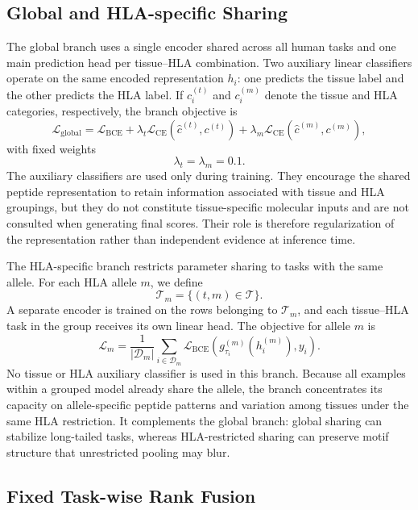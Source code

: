 \subsection{Global and HLA-specific Sharing}

The global branch uses a single encoder shared across all human tasks and one main prediction head per tissue--HLA combination. Two auxiliary linear classifiers operate on the same encoded representation \(h_i\): one predicts the tissue label and the other predicts the HLA label. If \(c_i^{(t)}\) and \(c_i^{(m)}\) denote the tissue and HLA categories, respectively, the branch objective is
\[
\mathcal{L}_{\mathrm{global}}
=
\mathcal{L}_{\mathrm{BCE}}
+
\lambda_t
\mathcal{L}_{\mathrm{CE}}
\left(
\widehat{c}^{(t)},c^{(t)}
\right)
+
\lambda_m
\mathcal{L}_{\mathrm{CE}}
\left(
\widehat{c}^{(m)},c^{(m)}
\right),
\]
with fixed weights
\[
\lambda_t=\lambda_m=0.1.
\]
The auxiliary classifiers are used only during training. They encourage the shared peptide representation to retain information associated with tissue and HLA groupings, but they do not constitute tissue-specific molecular inputs and are not consulted when generating final scores. Their role is therefore regularization of the representation rather than independent evidence at inference time.

The HLA-specific branch restricts parameter sharing to tasks with the same allele. For each HLA allele \(m\), we define
\[
\mathcal{T}_m
=
\{(t,m)\in\mathcal{T}\}.
\]
A separate encoder is trained on the rows belonging to \(\mathcal{T}_m\), and each tissue--HLA task in the group receives its own linear head. The objective for allele \(m\) is
\[
\mathcal{L}_{m}
=
\frac{1}{|\mathcal{D}_m|}
\sum_{i\in\mathcal{D}_m}
\mathcal{L}_{\mathrm{BCE}}
\left(
g^{(m)}_{\tau_i}(h_i^{(m)}),y_i
\right).
\]
No tissue or HLA auxiliary classifier is used in this branch. Because all examples within a grouped model already share the allele, the branch concentrates its capacity on allele-specific peptide patterns and variation among tissues under the same HLA restriction. It complements the global branch: global sharing can stabilize long-tailed tasks, whereas HLA-restricted sharing can preserve motif structure that unrestricted pooling may blur.

\subsection{Fixed Task-wise Rank Fusion}

